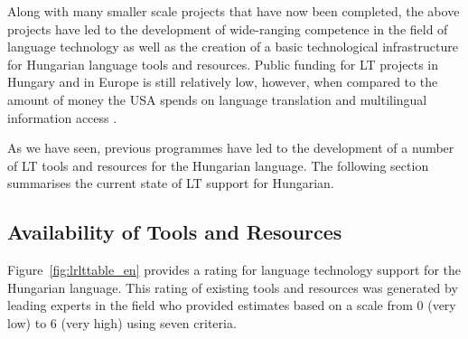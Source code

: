 \begin{multicols}{2}
      Along with many smaller scale projects that have now been completed, the above projects have led to the development of wide-ranging competence in the field of language technology as well as the creation of a basic technological infrastructure for Hungarian language tools and resources. Public funding for LT projects in Hungary and in Europe is still relatively low, however, when compared to the amount of money the USA spends on language translation and multilingual information access \cite{laz1}.  

  As we have seen, previous programmes have led to the development of a number of LT tools and resources for the Hungarian language. The following section summarises the current state of LT support for Hungarian.

  \subsection{Availability of Tools and Resources}

  Figure~\ref{fig:lrlttable_en} provides a rating for language technology support for the Hungarian language. This rating of existing tools and resources was generated by leading experts in the field who provided estimates based on a scale from 0 (very low) to 6 (very high) using seven criteria.


\end{multicols}
